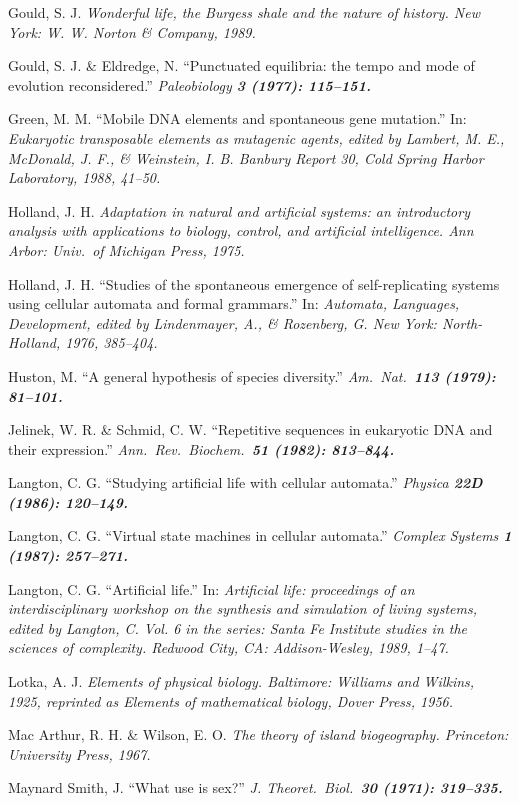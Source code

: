 Gould, S. J.  \it Wonderful life, the Burgess shale and the nature
of history\rm .  New York: W. W. Norton \& Company, 1989.

Gould, S. J. \& Eldredge, N.  ``Punctuated equilibria: the tempo and mode of
evolution reconsidered.''  \it Paleobiology \bf 3 \rm (1977): 115--151.

Green, M. M.  ``Mobile DNA elements and spontaneous gene mutation.''
In: \it Eukaryotic transposable elements as mutagenic agents\rm ,
edited by Lambert, M. E., McDonald, J. F., \& Weinstein, I. B.
Banbury Report 30, Cold Spring Harbor Laboratory, 1988, 41--50.

Holland, J. H.  \it Adaptation in natural and artificial systems:
an introductory analysis with applications to biology, control, and
artificial intelligence\rm .  Ann Arbor: Univ.\ of Michigan Press, 1975.

Holland, J. H.  ``Studies of the spontaneous emergence of
self-replicating systems using cellular automata and formal grammars.''
In: \it Automata, Languages, Development\rm , edited by Lindenmayer, A.,
\& Rozenberg, G.  New York: North-Holland, 1976, 385--404.

Huston, M.  ``A general hypothesis of species diversity.''
\it Am.\ Nat.\ \bf 113 \rm (1979): 81--101.

Jelinek, W. R. \& Schmid, C. W.  ``Repetitive sequences in eukaryotic DNA and
their expression.''  \it Ann.\ Rev.\ Biochem.\ \bf 51 \rm (1982): 813--844.

Langton, C. G.  ``Studying artificial life with cellular automata.''
\it Physica \bf 22D \rm (1986): 120--149.

Langton, C. G.  ``Virtual state machines in cellular automata.''
\it Complex Systems \bf 1 \rm (1987): 257--271.

Langton, C. G.  ``Artificial life.''  In: \it Artificial life: proceedings
of an interdisciplinary workshop on the synthesis and simulation of living
systems\rm , edited by Langton, C.  Vol. 6 in the series: Santa Fe Institute
studies in the sciences of complexity. Redwood City, CA: Addison-Wesley,
1989, 1--47.

Lotka, A. J.  \it Elements of physical biology\rm .  Baltimore: Williams and
Wilkins, 1925, reprinted as \it Elements of mathematical biology\rm ,
Dover Press, 1956.

Mac Arthur, R. H. \& Wilson, E. O.  \it The theory of
island biogeography\rm .  Princeton: University Press, 1967.

Maynard Smith, J.  ``What use is sex?''  \it J. Theoret.\ Biol.\ \bf 30 \rm
(1971): 319--335.

